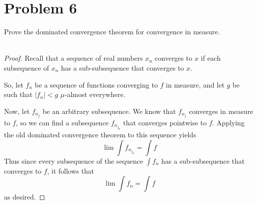 \documentclass[fontsize=11pt]{scrartcl} %
\numberwithin{equation}{section} %
\numberwithin{figure}{section} %
\numberwithin{table}{section} %
\begin{document}
\section*{Problem 6}
Prove the dominated convergence theorem for convergence in measure.
\\
\\
\begin{proof}
    Recall that a sequence of real numbers $x_n$ converges to $x$ if each
    subsequence of $x_n$ has a sub-subsequence that converges to $x$.

    So, let $f_n$ be a sequence of functions converging to $f$ in measure, and
    let $g$ be such that $|f_n|<g$ $\mu$-almost everywhere.

    Now, let $f_{n_j}$ be an arbitrary subsequence. We know that $f_{n_j}$
    converges in measure to $f$, so we can find a subsequence $f_{n_{j_k}}$ that
    converges pointwise to $f$. Applying the old dominated convergence theorem
    to this sequence yields
    \[
        \lim\int f_{n_{j_k}} = \int f
    \]
    Thus since every subsequence of the sequence $\int f_n$ has a
    sub-subsequence that converges to $f$, it follows that
    \[
        \lim\int f_n = \int f
    \]
    as desired.
\end{proof}
\end{document}
